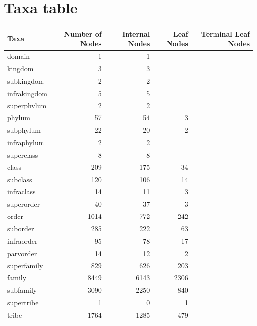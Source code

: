   \section{Taxa table}\label{sec:taxaTable2}
    \begin{center}
      \begin{tabular}{ |l|r||r|r|r| }
        \hline
        Taxa & Number of Nodes & Internal Nodes & Leaf Nodes & Terminal Leaf Nodes \\
        \hline \hline
        \setrow{\bfseries}domain & 1 & 1 & &  \\ \hline
        \setrow{\bfseries}kingdom & 3 & 3 & &  \\
        subkingdom & 2 & 2 & & \\
        infrakingdom & 5 & 5 & & \\
        superphylum & 2 & 2 & & \\ \hline
        \setrow{\bfseries}phylum & 57 & 54 & 3 & \\
        subphylum & 22 & 20 & 2 & \\
        infraphylum & 2 & 2 & & \\
        superclass & 8 & 8 & & \\ \hline
        \setrow{\bfseries}class & 209 & 175 & 34 & \\
        subclass & 120 & 106 & 14 & \\
        infraclass & 14 & 11 & 3 & \\
        superorder & 40 & 37 & 3 & \\ \hline
        \setrow{\bfseries}order & 1014 & 772 & 242 & \\
        suborder & 285 & 222 & 63 & \\
        infraorder & 95 & 78 & 17 & \\
        parvorder & 14 & 12 & 2 & \\
        superfamily & 829 & 626 & 203 & \\ \hline
        \setrow{\bfseries}family & 8449 & 6143 & 2306 & \\
        subfamily & 3090 & 2250 & 840 & \\
        supertribe & 1 & 0 & 1 & \\
        tribe & 1764 & 1285 & 479 & \\

\end{tabular}
\end{center}
